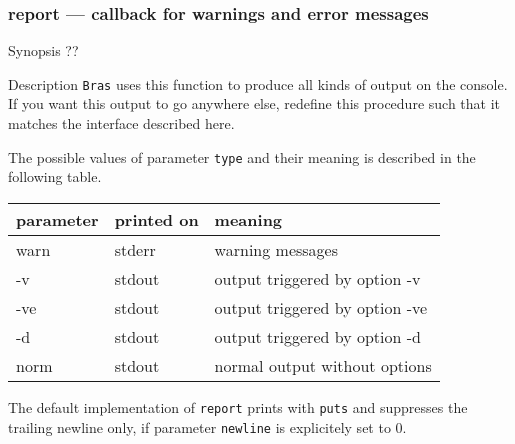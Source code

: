 \documentclass[11pt]{scrartcl}
\newcommand{\Bras}{\texttt{Bras}}
\begin{document}
\subsubsection{report --- callback for warnings and error messages}
\label{proc:report}
\begin{Describe}
\item[Synopsis]    ??
\item[Description] \Bras{} uses this function to produce all kinds of
  output on the console. If you want this output to go anywhere else,
  redefine this procedure such that it matches the interface described 
  here.
  
  The possible values of parameter \texttt{type} and their meaning is
  described in the following table.
  \begin{center}
    \begin{tabular}{>{\ttfamily}l>{\ttfamily}ll}
      \rmfamily parameter & \rmfamily printed on &meaning\\\hline
      warn & stderr & warning messages \\
      -v   & stdout & output triggered by option -v\\
      -ve  & stdout & output triggered by option -ve\\
      -d   & stdout & output triggered by option -d\\
      norm & stdout & normal output without options \\
    \end{tabular}
  \end{center}
  The default implementation of \texttt{report} prints with
  \texttt{puts} and suppresses the trailing newline only, if parameter 
  \texttt{newline} is explicitely set to $0$.
\end{Describe}
\end{document}
